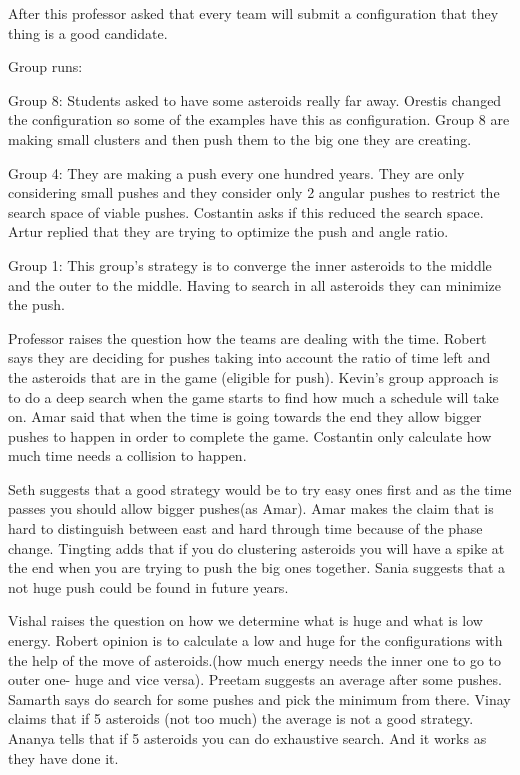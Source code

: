 After this professor asked that every team will submit a configuration that they thing is a good candidate. 

Group runs:

Group 8:
Students asked to have some asteroids really far away. Orestis changed the configuration so some of the examples have this as configuration.
Group 8 are making small clusters and then push them to the big one they are creating.

Group 4:
They are making a push every one hundred years. They are only considering small pushes and they consider only 2 angular pushes to restrict the search space of viable pushes.
Costantin asks if this reduced the search space.
Artur replied that they are trying to optimize the push and angle ratio.

Group 1:
This group’s strategy is to converge the inner asteroids to the middle and the outer to the middle. Having to search in all asteroids they can minimize the push.

Professor raises the question how the teams are dealing with the time.
Robert says they are deciding for pushes taking into account the ratio of time left and the asteroids that are in the game (eligible for push).
Kevin’s group approach is to do a deep search when the game starts to find how much a schedule will take on.
Amar said that when the time is going towards the end they allow bigger pushes to happen in order to complete the game.
Costantin only calculate how much time needs a collision to happen.

Seth suggests that a good strategy would be to try easy ones first and as the time passes you should allow bigger pushes(as Amar).
Amar makes the claim that is hard to distinguish between east and hard through time because of the phase change.
Tingting adds that if you do clustering asteroids you will have a spike at the end when you are trying to push the big ones together.
Sania suggests that a not huge push could be found in future years.

Vishal raises the question on how we determine what is huge and what is low energy.
Robert opinion is to calculate a low and huge for the configurations with the help of the move of asteroids.(how much energy needs the inner one to go to outer one- huge and vice versa).
Preetam suggests an average after some pushes.
Samarth says do search for some pushes and pick the minimum from there.
Vinay claims that if 5 asteroids (not too much) the average is not a good strategy.
Ananya tells that if 5 asteroids you can do exhaustive search. And it works as they have done it.

